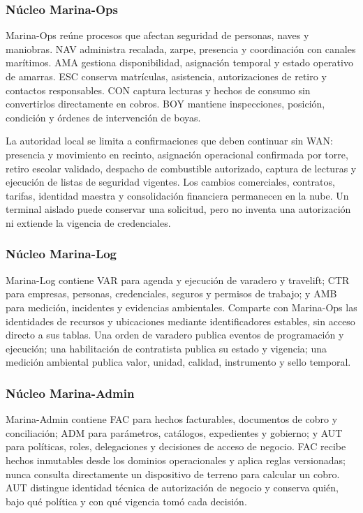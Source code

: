 \documentclass[11pt,letterpaper]{report}
\begin{document}
\subsubsection*{Núcleo Marina-Ops}

Marina-Ops reúne procesos que afectan seguridad de personas, naves y maniobras. NAV administra recalada, zarpe, presencia y coordinación con canales marítimos. AMA gestiona disponibilidad, asignación temporal y estado operativo de amarras. ESC conserva matrículas, asistencia, autorizaciones de retiro y contactos responsables. CON captura lecturas y hechos de consumo sin convertirlos directamente en cobros. BOY mantiene inspecciones, posición, condición y órdenes de intervención de boyas.

La autoridad local se limita a confirmaciones que deben continuar sin WAN: presencia y movimiento en recinto, asignación operacional confirmada por torre, retiro escolar validado, despacho de combustible autorizado, captura de lecturas y ejecución de listas de seguridad vigentes. Los cambios comerciales, contratos, tarifas, identidad maestra y consolidación financiera permanecen en la nube. Un terminal aislado puede conservar una solicitud, pero no inventa una autorización ni extiende la vigencia de credenciales.

\subsubsection*{Núcleo Marina-Log}

Marina-Log contiene VAR para agenda y ejecución de varadero y travelift; CTR para empresas, personas, credenciales, seguros y permisos de trabajo; y AMB para medición, incidentes y evidencias ambientales. Comparte con Marina-Ops las identidades de recursos y ubicaciones mediante identificadores estables, sin acceso directo a sus tablas. Una orden de varadero publica eventos de programación y ejecución; una habilitación de contratista publica su estado y vigencia; una medición ambiental publica valor, unidad, calidad, instrumento y sello temporal.

\subsubsection*{Núcleo Marina-Admin}

Marina-Admin contiene FAC para hechos facturables, documentos de cobro y conciliación; ADM para parámetros, catálogos, expedientes y gobierno; y AUT para políticas, roles, delegaciones y decisiones de acceso de negocio. FAC recibe hechos inmutables desde los dominios operacionales y aplica reglas versionadas; nunca consulta directamente un dispositivo de terreno para calcular un cobro. AUT distingue identidad técnica de autorización de negocio y conserva quién, bajo qué política y con qué vigencia tomó cada decisión.
\end{document}
